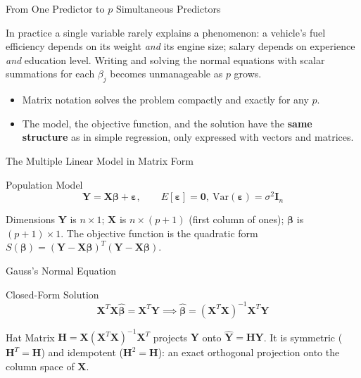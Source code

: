 \documentclass[10pt, aspectratio=169]{beamer}
\begin{document}
\begin{frame}{From One Predictor to $p$ Simultaneous Predictors}
  \footnotesize
  \begin{motivacion}
    In practice a single variable rarely explains a phenomenon: a vehicle's fuel efficiency depends on its weight \emph{and} its engine size; salary depends on experience \emph{and} education level. Writing and solving the normal equations with scalar summations for each $\beta_j$ becomes unmanageable as $p$ grows.
  \end{motivacion}

  \vspace{0.15cm}
  \pause
  \begin{itemize}\itemsep=0.1cm
    \item Matrix notation solves the problem compactly and exactly for any $p$. \pause
    \item The model, the objective function, and the solution have the \textbf{same structure} as in simple regression, only expressed with vectors and matrices.
  \end{itemize}
\end{frame}

\begin{frame}{The Multiple Linear Model in Matrix Form}
  \footnotesize
  \begin{block}{Population Model}
    $$\mathbf{Y}=\mathbf{X}\boldsymbol\beta+\boldsymbol\varepsilon, \qquad E[\boldsymbol\varepsilon]=\mathbf{0},\ \text{Var}(\boldsymbol\varepsilon)=\sigma^2\mathbf{I}_n$$
  \end{block}
  \pause

  \vspace{0.1cm}
  \begin{alertblock}{Dimensions}
    $\mathbf{Y}$ is $n\times1$; $\mathbf{X}$ is $n\times(p+1)$ (first column of ones); $\boldsymbol\beta$ is $(p+1)\times1$. The objective function is the quadratic form $S(\boldsymbol\beta)=(\mathbf{Y}-\mathbf{X}\boldsymbol\beta)^T(\mathbf{Y}-\mathbf{X}\boldsymbol\beta)$.
  \end{alertblock}
\end{frame}

\begin{frame}{Gauss's Normal Equation}
  \footnotesize
  \begin{block}{Closed-Form Solution}
    $$\mathbf{X}^T\mathbf{X}\hat{\boldsymbol\beta}=\mathbf{X}^T\mathbf{Y} \implies \hat{\boldsymbol\beta}=(\mathbf{X}^T\mathbf{X})^{-1}\mathbf{X}^T\mathbf{Y}$$
  \end{block}
  \pause

  \vspace{0.1cm}
  \begin{alertblock}{Hat Matrix}
    $\mathbf{H}=\mathbf{X}(\mathbf{X}^T\mathbf{X})^{-1}\mathbf{X}^T$ projects $\mathbf{Y}$ onto $\hat{\mathbf{Y}}=\mathbf{H}\mathbf{Y}$. It is symmetric ($\mathbf{H}^T=\mathbf{H}$) and idempotent ($\mathbf{H}^2=\mathbf{H}$): an exact orthogonal projection onto the column space of $\mathbf{X}$.
  \end{alertblock}
\end{frame}
\end{document}
